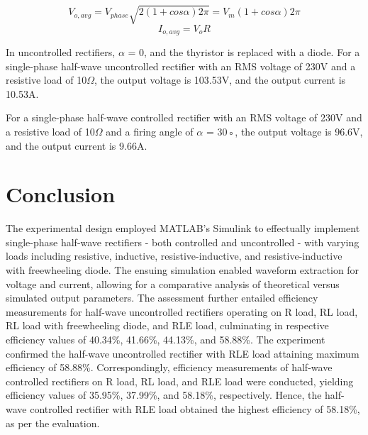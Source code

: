$$
    V_{o,avg} =
    V_{phase}
    \sqrt{2(1 + cos\alpha)2\pi} =
    V_m(1 + cos\alpha)
    2\pi
$$
$$
    I_{o,avg} =
    V_oR
$$

In uncontrolled rectifiers, $ \alpha$ = 0, and the thyristor is replaced with a diode.
For a single-phase half-wave uncontrolled rectifier with an RMS voltage of 230V
and a resistive load of 10$ \Omega $,
the output voltage is 103.53V, and the output current is 10.53A.

For a single-phase half-wave controlled rectifier with an RMS voltage of 230V
and a resistive load of 10$ \Omega $ and a firing angle of $ \alpha  $ = 30◦, the output voltage
is 96.6V, and the output current is 9.66A.

\pagebreak











\section{Conclusion}


\hspace{\parindent}

The experimental design employed MATLAB's Simulink to effectually implement single-phase half-wave rectifiers - both controlled and uncontrolled - with varying loads including resistive, inductive, resistive-inductive, and resistive-inductive with freewheeling diode. The ensuing simulation enabled waveform extraction for voltage and current, allowing for a comparative analysis of theoretical versus simulated output parameters. The assessment further entailed efficiency measurements for half-wave uncontrolled rectifiers operating on R load, RL load, RL load with freewheeling diode, and RLE load, culminating in respective efficiency values of 40.34\%, 41.66\%, 44.13\%, and 58.88\%. The experiment confirmed the half-wave uncontrolled rectifier with RLE load attaining maximum efficiency of 58.88\%. Correspondingly, efficiency measurements of half-wave controlled rectifiers on R load, RL load, and RLE load were conducted, yielding efficiency values of 35.95\%, 37.99\%, and 58.18\%, respectively. Hence, the half-wave controlled rectifier with RLE load obtained the highest efficiency of 58.18\%, as per the evaluation.
\pagebreak
